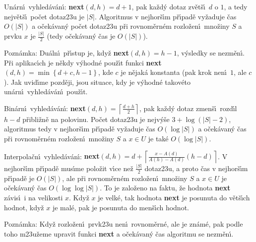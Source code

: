 \flushpar Un\'arn\'\i\ vyhled\'av\'an\'\i : {\bf next$\left(d,h\right)=d+1$}, pak ka\v zd\'y 
dotaz zv\v et\v s\'\i\ $d$ o $1$, a tedy nejv\v et\v s\'\i\ po\v cet 
dotaz\accent23u je $|S|$. Algoritmus v nej\-hor\v s\'\i m p\v r\'\i pad\v e 
vy\v zaduje \v cas $O\left(|S|\right)$ a o\v cek\'avan\'y po\v cet dotaz\accent23u p\v ri 
rovnom\v ern\'em rozlo\v zen\'\i\ mno\v ziny $S$ a prvku $x$ je $\frac {
|S|}2$ 
(tedy o\v cek\'avan\'y \v cas je $O\left(|S|\right)$). 
\medskip

\flushpar Pozn\'amka: Du\'aln\'\i\ p\v r\'\i stup je, kdy\v z 
{\bf next$\left(d,h\right)=h-1$}, v\'ysled\-ky se nezm\v en\'\i . P\v ri aplikac\'\i ch je 
n\v ekdy v\'yhodn\'e pou\v z\'\i t funkci {\bf next$\left(d,h\right)=\min\left\{d
+c,h-1\right\}$}, 
kde $c$ je n\v ejak\'a konstanta (pak krok nen\'\i\ $1$, ale $c$). Jak 
uvid\'\i me pozd\v eji, jsou situace, kdy je v\'yhodn\'e  
takov\'eto un\'arn\'\i\ vyhled\'av\'an\'\i\ pou\v z\'\i t.
\medskip

\flushpar Bin\'arn\'\i\ vyhled\'av\'an\'\i : {\bf next$\left(d,h\right)=\left\lceil\frac {
d+h}2\right\rceil$}, pak 
ka\v zd\'y dotaz zmen\v s\'\i\ rozd\'\i l $h-d$ p\v ribli\v zn\v e na polovinu. 
Po\v cet dotaz\accent23u je nejv\'y\v se $3+\log\left(|S|-2\right)$, 
algoritmus tedy v 
nejhor\v s\'\i m p\v r\'\i pad\v e vy\v zaduje \v cas $O\left(\log|S|\right)$ a  
o\v cek\'avan\'y \v cas p\v ri rovnom\v ern\'em roz\-lo\v zen\'\i\ mno\v ziny $
S$ a 
$x\in U$ je tak\'e $O\left(\log|S|\right)$.
\medskip

\flushpar Interpola\v cn\'\i\ vyhled\'av\'an\'\i : 
{\bf next$\left(d,h\right)=d+\left\lceil\frac {x-A\left(d\right)}{A\left(h\right)-A\left(d\right)}\left(h-d\right)\right\rceil$}. V nejhor\v s\'\i m p\v r\'\i pad\v e 
mus\'\i me polo\v zit v\'\i ce ne\v z $\frac {|S|}2$ dotaz\accent23u, a proto \v cas 
v nejhor\v s\'\i m p\v r\'\i pad\v e je $O\left(|S|\right)$, ale p\v ri rovnom\v ern\'em 
roz\-lo\v zen\'\i\ mno\v ziny $S$ a $x\in U$ je o\v cek\'avan\'y \v cas 
$O\left(\log\log|S|\right)$. To je zalo\v zeno na faktu, \v ze hodnota {\bf next }
z\'avis\'\i\ i na velikosti $x$. Kdy\v z $x$ je velk\'e, tak hodnota 
{\bf next} je posunuta do v\v et\v s\'\i ch hodnot, kdy\v z $x$ je mal\'e, 
pak je posunuta do men\v s\'\i ch hodnot.
\medskip

\flushpar Pozn\'amka: Kdy\v z rozlo\v zen\'\i\ prvk\accent23u nen\'\i\ 
rovnom\v ern\'e, ale je zn\'a\-m\'e, pak podle toho m\accent23u\v zeme  
upravit funkci {\bf next} a o\v cek\'avan\'y \v cas algoritmu se 
nezm\v en\'\i .
\medskip


